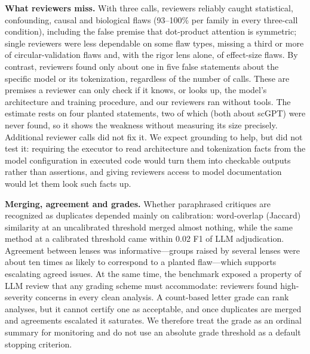 \documentclass[10pt,letterpaper]{article}
\begin{document}
\textbf{What reviewers miss.} With three calls, reviewers reliably caught statistical, confounding, causal and biological flaws (93--100\% per family in every three-call condition), including the false premise that dot-product attention is symmetric; single reviewers were less dependable on some flaw types, missing a third or more of circular-validation flaws and, with the rigor lens alone, of effect-size flaws. By contrast, reviewers found only about one in five false statements about the specific model or its tokenization, regardless of the number of calls. These are premises a reviewer can only check if it knows, or looks up, the model's architecture and training procedure, and our reviewers ran without tools. The estimate rests on four planted statements, two of which (both about scGPT) were never found, so it shows the weakness without measuring its size precisely. Additional reviewer calls did not fix it. We expect grounding to help, but did not test it: requiring the executor to read architecture and tokenization facts from the model configuration in executed code would turn them into checkable outputs rather than assertions, and giving reviewers access to model documentation would let them look such facts up.

\textbf{Merging, agreement and grades.} Whether paraphrased critiques are recognized as duplicates depended mainly on calibration: word-overlap (Jaccard) similarity at an uncalibrated threshold merged almost nothing, while the same method at a calibrated threshold came within 0.02 F1 of LLM adjudication. Agreement between lenses was informative---groups raised by several lenses were about ten times as likely to correspond to a planted flaw---which supports escalating agreed issues. At the same time, the benchmark exposed a property of LLM review that any grading scheme must accommodate: reviewers found high-severity concerns in every clean analysis. A count-based letter grade can rank analyses, but it cannot certify one as acceptable, and once duplicates are merged and agreements escalated it saturates. We therefore treat the grade as an ordinal summary for monitoring and do not use an absolute grade threshold as a default stopping criterion.
\end{document}
